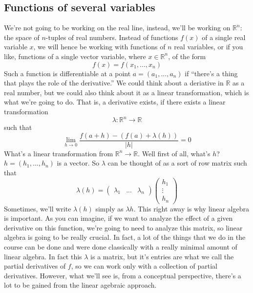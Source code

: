 \documentclass{article}
\newcommand{\reals}[0]{\mathbb{R}}
\begin{document}
\subsection{Functions of several variables}

We're not going to be working on the real line, instead, we'll be working on \(\reals^n\): the space of \(n\)-tuples of real numbers. Instead of functions \(f(x)\) of a single real variable \(x\), we will hence be working with functions of \(n\) real variables, or if you like, functions of a single vector variable, where \(x \in \reals^n\), of the form
\begin{equation}f(x) = f(x_1,...,x_n)\end{equation}
Such a function is differentiable at a point \(a = (a_1,...,a_n)\) if ``there's a thing that plays the role of the derivative.'' We could think about a deriative in \(\reals\) as a real number, but we could also think about it as a linear transformation, which is what we're going to do. That is, a derivative exists, if there exists a linear transformation
\begin{equation}\lambda: \reals^n \to \reals\end{equation}
such that
\begin{equation}\lim_{h \to 0}\frac{f(a + h) - (f(a) + \lambda(h))}{|h|} = 0\end{equation}
What's a linear transformation from \(\reals^n \to \reals\). Well first of all, what's \(h\)? \(h = (h_1,...,h_n)\) is a vector. So \(\lambda\) can be thought of as a sort of row matrix such that
\begin{equation}\lambda(h) = \begin{pmatrix}\lambda_1 & ... & \lambda_n\end{pmatrix}\begin{pmatrix} h_1 \\ \vdots \\ h_n\end{pmatrix}\end{equation}
Sometimes, we'll write \(\lambda(h)\) simply as \(\lambda h\). This right away is why linear algebra is important. As you can imagine, if we want to analyze the effect of a given derivative on this function, we're going to need to analyze this matrix, so linear algebra is going to be really crucial. In fact, a lot of the things that we do in the course can be done and were done classically with a really minimal amount of linear algebra. In fact this \(\lambda\) is a matrix, but it's entries are what we call the partial derivatives of \(f\), so we can work only with a collection of partial derivatives. However, what we'll see is, from a conceptual perspective, there's a lot to be gained from the linear agebraic approach.
\end{document}

